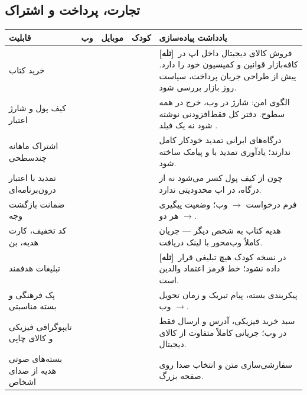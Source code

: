 \documentclass[11pt,a4paper]{article}
\newcommand{\lt}[1]{{\latinfont\LRE{#1}}}
\newcommand{\cd}[1]{{\codefont\LRE{#1}}}
\newcommand{\full}{\textcolor{sys}{\CIRCLE}}
\newcommand{\half}{\textcolor{soft}{\LEFTcircle}}
\newcommand{\none}{\textcolor{rule}{\Circle}}
\newcommand{\tagbox}[2]{{\small\textcolor{#1}{\textbf{#2}}}}
\newcommand{\ttrap}{\tagbox{warn}{[تله]}}
\newcommand{\feathead}{%
\toprule
\textbf{قابلیت} & \textcolor{web}{\textbf{وب}} & \textcolor{mob}{\textbf{موبایل}} & \textcolor{kid}{\textbf{کودک}} & \textbf{یادداشت پیاده‌سازی} \\
\midrule
}
\begin{document}
\subsection{تجارت، پرداخت و اشتراک}
\begin{longtable}{@{}F{3.9cm} c c c N{7.2cm}@{}}
\feathead
\endhead
خرید کتاب & \full & \half & \none & \ttrap\ فروش کالای دیجیتال داخل اپ در کافه‌بازار قوانین و کمیسیون خود را دارد. پیش از طراحی جریان پرداخت، سیاست روز بازار بررسی شود. \\
کیف پول و شارژ اعتبار & \full & \half & \none & الگوی امن: شارژ در وب، خرج در همه سطوح. دفتر کل فقط‌افزودنی نوشته شود نه یک فیلد \cd{balance}. \\
اشتراک ماهانه چندسطحی & \full & \half & \none & درگاه‌های ایرانی تمدید خودکار کامل ندارند؛ یادآوری تمدید با \lt{push} و پیامک ساخته شود. \\
تمدید با اعتبار درون‌برنامه‌ای & \full & \full & \none & چون از کیف پول کسر می‌شود نه از درگاه، در اپ محدودیتی ندارد. \\
ضمانت بازگشت وجه & \full & \half & \none & فرم درخواست $\rightarrow$ وب؛ وضعیت پیگیری $\rightarrow$ هر دو. \\
کد تخفیف، کارت هدیه، بن & \full & \full & \none & هدیه کتاب به شخص دیگر --- جریان کاملاً وب‌محور با لینک دریافت. \\
تبلیغات هدفمند & \full & \full & \none & \ttrap\ در نسخه کودک هیچ تبلیغی قرار داده نشود؛ خط قرمز اعتماد والدین است. \\
پک فرهنگی و بسته مناسبتی & \full & \half & \none & پیکربندی بسته، پیام تبریک و زمان تحویل $\rightarrow$ وب. \\
تایپوگرافی فیزیکی و کالای چاپی & \full & \half & \none & سبد خرید فیزیکی، آدرس و ارسال فقط در وب؛ جریانی کاملاً متفاوت از کالای دیجیتال. \\
بسته‌های صوتی هدیه از صدای اشخاص & \full & \half & \none & سفارشی‌سازی متن و انتخاب صدا روی صفحه بزرگ. \\
\bottomrule
\end{longtable}
\end{document}
